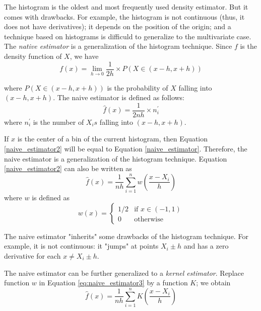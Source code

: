The histogram is the oldest and most frequently used density estimator. But it 
comes with drawbacks. For example, the histogram is not continuous (thus, it 
does not have derivatives); it depends on the position of the origin; and a 
technique based on histograms is difficuld to generalize to the multivariate 
case. The \emph{native estimator} is a generalization of the histogram 
technique. Since $f$ is the density function of $X$, we have
\begin{equation}\label{eq:naive_estimator}
	f(x) = \lim\limits_{h \rightarrow 0} \frac{1}{2h} \times P(X \in (x-h,x+h))
\end{equation}

where $P(X \in (x-h,x+h))$ is the probability of $X$ falling into $(x-h,x+h)$.
The naive estimator is defined as follows:
\begin{equation}\label{eq:naive_estimator2}
	\hat{f}(x) = \frac{1}{2nh} \times n_i^{\prime}
\end{equation}
where $n_i^{\prime}$ is the number of $X_i s$ falling into $(x-h,x+h)$. 

If $x$ is the center of a bin of the current histogram, then Equation 
\eqref{naive_estimator2} will be equal to Equation \eqref{naive_estimator}. 
Therefore, the naive estimator is a generalization of the histogram technique.
Equation \eqref{naive_estimator2} can also be written as
\begin{equation}\label{eq:naive_estimator3}
	\hat{f}(x) = \frac{1}{nh}\sum_{i=1}^n w\left( \frac{x - X_i}{h} \right)
\end{equation}
where $w$ is defined as 
\begin{equation}\label{naive_estimator3}
	w(x) = \begin{cases}
				1/2 & \text{if } x \in (-1,1) \\
				0 & \text{otherwise }
		\end{cases}
\end{equation}

The naive estimator "inherits" some drawbacks of the histogram technique.
For example, it is not continuous: it "jumps" at points $X_i \pm h$ and has a 
zero derivative for each $x \neq X_i \pm h$.

The naive estimator can be further generalized to a \emph{kernel estimator}. 
Replace function $w$ in Equation \eqref{eq:naive_estimator3} by a function $K$;
we obtain
\begin{equation}\label{eq:kernel_estimator}
	\hat{f}(x) = \frac{1}{nh} \sum_{i=1}^n K\left( \frac{x - X_i}{h} \right)
\end{equation}

